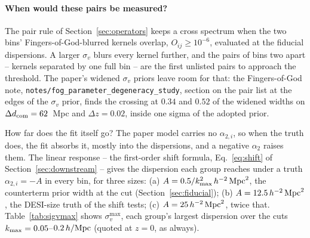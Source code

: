 \documentclass[11pt]{article}
\newcommand{\kmax}{k_{\rm max}}
\newcommand{\hMpc}{\,h/{\rm Mpc}}
\newcommand{\aunit}{\,h^{-2}\,{\rm Mpc}^2}
\newcommand{\us}{\_\allowbreak}
\begin{document}
\paragraph{When would these pairs be measured?}
The pair rule of Section~\ref{sec:operators} keeps a cross spectrum
when the two bins' Fingers-of-God-blurred kernels overlap,
$O_{ij} \ge 10^{-6}$, evaluated at the fiducial dispersions.  A larger
$\sigma_v$ blurs every kernel further, and the pairs of bins two apart
-- kernels separated by one full bin -- are the first unlisted pairs
to approach the threshold.  The paper's widened $\sigma_v$ priors
leave room for that: the Fingers-of-God note,
\texttt{notes/fog\us parameter\us degeneracy\us study}, section on the
pair list at the edges of the $\sigma_v$ prior, finds the crossing at
$0.34$ and $0.52$ of the widened widths on
$\Delta d_{\rm com} = 62$~Mpc and $\Delta z = 0.02$, inside one sigma
of the adopted prior.

How far does the fit itself go?  The paper model carries no
$\alpha_{2,i}$, so when the truth does, the fit absorbs it, mostly
into the dispersions, and a negative $\alpha_2$ raises them.  The
linear response -- the first-order shift formula,
Eq.~\eqref{eq:shift} of Section~\ref{sec:downstream} --
gives the dispersion each group reaches under a truth
$\alpha_{2,i} = -A$ in every bin, for three sizes: (a)
$A = 0.5/\kmax^2\aunit$, the counterterm prior width at the cut
(Section~\ref{sec:fiducial}); (b)
$A = 12.5\aunit$, the DESI-size truth of the shift tests; (c)
$A = 25\aunit$, twice that.  Table~\ref{tab:sigvmax} shows
$\sigma_v^{\max}$, each group's largest dispersion over the cuts
$\kmax = 0.05$--$0.2\hMpc$ (quoted at $z = 0$, as always).
\end{document}
